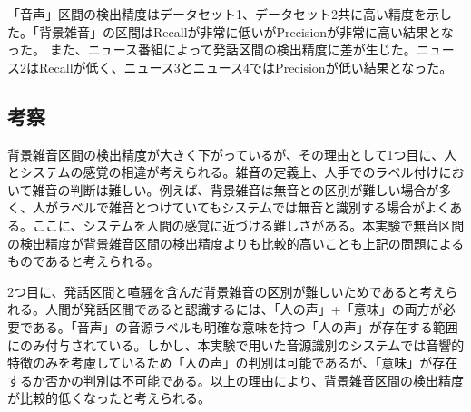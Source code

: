 「音声」区間の検出精度はデータセット1、データセット2共に高い精度を示した。「背景雑音」の区間はRecallが非常に低いがPrecisionが非常に高い結果となった。
また、ニュース番組によって発話区間の検出精度に差が生じた。ニュース2はRecallが低く、ニュース3とニュース4ではPrecisionが低い結果となった。

\subsection{考察}
背景雑音区間の検出精度が大きく下がっているが、その理由として1つ目に、人とシステムの感覚の相違が考えられる。雑音の定義上、人手でのラベル付けにおいて雑音の判断は難しい。例えば、背景雑音は無音との区別が難しい場合が多く、人がラベルで雑音とつけていてもシステムでは無音と識別する場合がよくある。ここに、システムを人間の感覚に近づける難しさがある。本実験で無音区間の検出精度が背景雑音区間の検出精度よりも比較的高いことも上記の問題によるものであると考えられる。\par
2つ目に、発話区間と喧騒を含んだ背景雑音の区別が難しいためであると考えられる。人間が発話区間であると認識するには、「人の声」+「意味」の両方が必要である。「音声」の音源ラベルも明確な意味を持つ「人の声」が存在する範囲にのみ付与されている。しかし、本実験で用いた音源識別のシステムでは音響的特徴のみを考慮しているため「人の声」の判別は可能であるが、「意味」が存在するか否かの判別は不可能である。以上の理由により、背景雑音区間の検出精度が比較的低くなったと考えられる。
